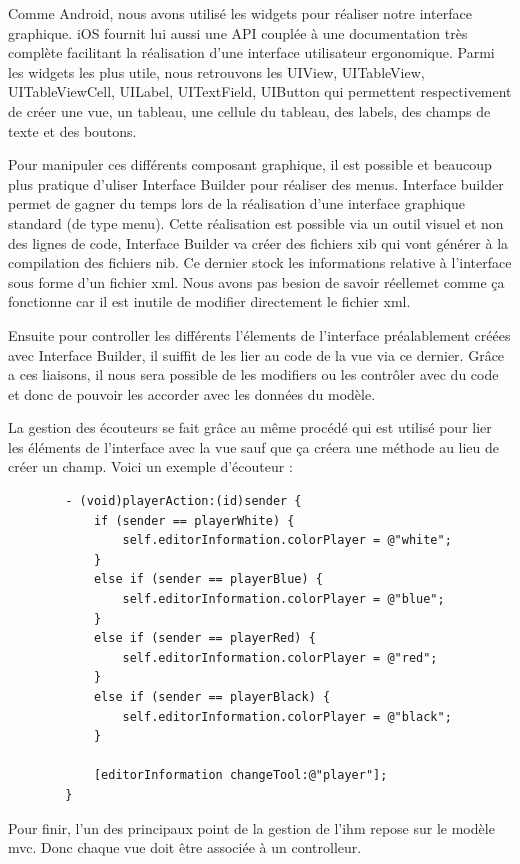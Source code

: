 	Comme Android, nous avons utilisé les widgets pour réaliser notre interface graphique. iOS fournit lui aussi une API couplée à une documentation très complète facilitant la réalisation d'une interface utilisateur ergonomique. Parmi les widgets les plus utile, nous retrouvons les UIView, UITableView, UITableViewCell, UILabel, UITextField, UIButton qui permettent respectivement de créer une vue, un tableau, une cellule du tableau, des labels, des champs de texte et des boutons.
	
	Pour manipuler ces différents composant graphique, il est possible et beaucoup plus pratique d'uliser Interface Builder pour réaliser des menus. Interface builder permet de gagner du temps lors de la réalisation d'une interface graphique standard (de type menu). Cette réalisation est possible via un outil visuel et non des lignes de code,  Interface Builder va créer des fichiers \gls{xib} qui vont générer à la compilation des fichiers \gls{nib}. Ce dernier stock les informations relative à l'interface sous forme d'un fichier \gls{xml}. Nous avons pas besion de savoir réellemet comme ça fonctionne car il est inutile de modifier directement le fichier \gls{xml}.
	
	Ensuite pour controller les différents l'élements de l'interface préalablement créées avec Interface Builder, il suiffit de les lier au code de la vue via ce dernier. Grâce a ces liaisons, il nous sera possible de les modifiers ou les contrôler avec du code et donc de pouvoir les accorder avec les données du modèle.
	
	La gestion des écouteurs se fait grâce au même procédé qui est utilisé pour lier les éléments de l'interface avec la vue sauf que ça créera une méthode au lieu de créer un champ. Voici un exemple d'écouteur :
	
	\begin{verbatim}
		- (void)playerAction:(id)sender {
		    if (sender == playerWhite) {
		        self.editorInformation.colorPlayer = @"white";
		    }
		    else if (sender == playerBlue) {
		        self.editorInformation.colorPlayer = @"blue";
		    }
		    else if (sender == playerRed) {
		        self.editorInformation.colorPlayer = @"red";
		    }
		    else if (sender == playerBlack) {
		        self.editorInformation.colorPlayer = @"black";
		    }
    
		    [editorInformation changeTool:@"player"];
		}
	\end{verbatim}
	
	Pour finir, l'un des principaux point de la gestion de l'\gls{ihm} repose sur le modèle \gls{mvc}. Donc chaque vue doit être associée à un controlleur.
				
